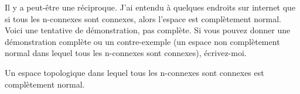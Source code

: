 \begin{probleme}
	Il y a peut-être une réciproque. J'ai entendu à quelques endroits sur internet que si tous les n-connexes sont connexes, alors l'espace est complètement normal. Voici une tentative de démonstration, pas complète. Si vous pouvez donner une démonstration complète ou un contre-exemple (un espace non complètement normal dans lequel tous les n-connexes sont connexes), écrivez-moi.
\end{probleme}

\begin{pseudotheorem}	\label{THOooMULNooNYeHAj}
	Un espace topologique dans lequel tous les n-connexes sont connexes est complètement normal.
\end{pseudotheorem}


